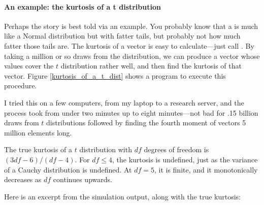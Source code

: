 \paragraph{An example: the kurtosis of a t distribution} Perhaps the
story is best told via an example.  You probably
know that a  is much like a Normal distribution but
with fatter tails, but probably not how much fatter those tails are.
The kurtosis of a vector is easy to calculate---just call
. By taking a million or so draws from the
distribution, we can produce a vector whose values cover the $t$
distribution rather well, and then find the kurtosis of that vector.
Figure \ref{kurtosis_of_a_t_dist} shows a program to execute this procedure. 

I tried this on a few computers, from my laptop to a research
server, and the process took from under two minutes up to eight
minutes---not bad for .15 billion draws from $t$ distributions followed
by finding the fourth moment of vectors 5 million elements
long.

The true kurtosis of a $t$ distribution with $df$ degrees of freedom
is $(3 df - 6)/(df - 4)$.  For $df\leq 4$, the kurtosis is undefined,
just as the variance of a Cauchy distribution is undefined. At $df = 5$,
it is finite, and it monotonically decreases as $df$ continues upwards.

Here is an excerpt from the simulation output, along with the true
kurtosis: 


